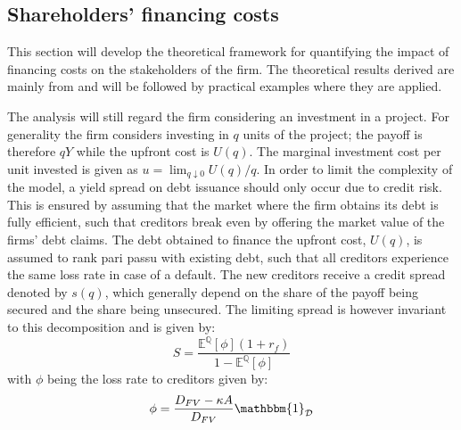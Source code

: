 \documentclass[../main.tex]{subfiles}
\begin{document}
    \newcommand{\discountfactor}{\frac{1}{1 + r_{f}}}
    \subsection{Shareholders' financing costs}
        This section will develop the theoretical framework for quantifying the impact of financing costs on the stakeholders of the firm.
        The theoretical results derived are mainly from \cite{ADS2019} and will be followed by practical examples where they are applied.


        The analysis will still regard the firm considering an investment in a project.
        For generality the firm considers investing in $q$ units of the project; 
        the payoff is therefore $qY$ while the upfront cost is $U(q)$. 
        The marginal investment cost per unit invested is given as 
        $u = \lim_{q\downarrow 0} U(q) / q$.
        In order to limit the complexity of the model, a yield spread on debt issuance should only occur due to credit risk. 
        This is ensured by assuming that the market where the firm obtains its debt is fully efficient, 
        such that creditors break even by offering the market value of the firms' debt claims.
        The debt obtained to finance the upfront cost, $U(q)$, is assumed to rank pari passu with existing debt, 
        such that all creditors experience the same loss rate in case of a default.
        The new creditors receive a credit spread denoted by $s(q)$,
        which generally depend on the share of the payoff being secured and the share being unsecured.
        The limiting spread is however invariant to this decomposition and is given by:
            \begin{equation}
                S = \frac{
                    \mathbb{E}^{\mathbb{Q}}\left[\phi\right] 
                    (1 + r_{f})
                }{
                    1 - \mathbb{E}^{\mathbb{Q}}\left[\phi\right]
                }
            \end{equation}
        with $\phi$ being the loss rate to creditors given by:
            \begin{equation}
                \phi = \frac{
                        D_{FV} - \kappa A
                    }{
                        D_{FV}
                    } 
                \mathbbm{1}_{\mathcal{D}}
            \end{equation}
\end{document}
